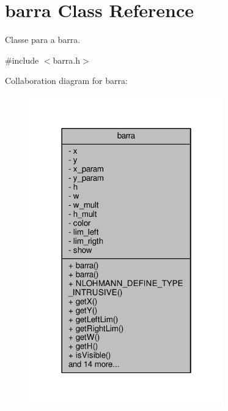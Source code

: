 \hypertarget{classbarra}{}\section{barra Class Reference}
\label{classbarra}


Classe para a barra.  




{\ttfamily \#include $<$barra.\+h$>$}



Collaboration diagram for barra\+:
\nopagebreak
\begin{figure}[H]
\begin{center}
\leavevmode
\includegraphics[width=238pt]{classbarra__coll__graph}
\end{center}
\end{figure}
